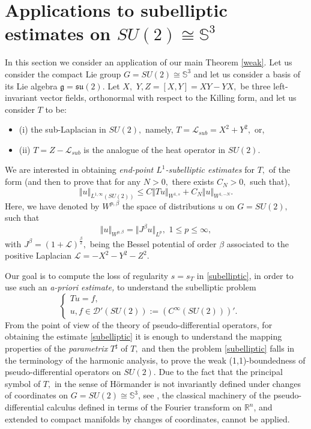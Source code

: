 \documentclass[12pt, reqno]{amsart}
\theoremstyle{definition}
\theoremstyle{remark}
\numberwithin{equation}{section}
\begin{document}
\section{Applications to subelliptic estimates on $SU(2)\cong \mathbb{S}^3$}\label{applications}
In this section we consider an application of our main Theorem \ref{weak}.
Let us consider the compact Lie group $G=SU(2)\cong \mathbb{S}^3$ and let us consider a basis of its Lie algebra $\mathfrak{g}=\mathfrak{su}(2).$ Let $X,$ $Y, Z=[X,Y]=XY-YX,$ be three left-invariant vector fields, orthonormal with respect to the Killing form, and let us consider $T$ to be: 
\begin{itemize}
    \item (i) the sub-Laplacian in $SU(2),$ namely, $T=\mathcal{L}_{sub}=X^2+Y^2,$ or,
    \item  (ii) $T=Z-\mathcal{L}_{sub}$ is the analogue of the heat operator in $SU(2).$
\end{itemize}  We are interested in obtaining {\it end-point $L^1$-subelliptic estimates} for $T,$ of the form (and then to prove that for any $N>0,$ there exists $C_N>0,$ such that),
\begin{equation}\label{subelliptic}
    \Vert u\Vert_{L^{1,\infty}(SU(2))}\leq C \Vert Tu\Vert_{W^{1,s}}+C_N\Vert u\Vert_{W^{1,-N}}.
\end{equation}
Here, we have denoted by $W^{p,\beta}$ the space of distributions $u$ on $G=SU(2),$ such that 
\begin{equation}
    \Vert u\Vert_{W^{p,\beta}}=\Vert J^\beta u\Vert_{L^p},\,\,1\leq p\leq \infty,
\end{equation} with $J^\beta=(1+\mathcal{L})^\frac{\beta}{2},$ being the Bessel potential of order $\beta$ associated to the positive Laplacian $\mathcal{L}=-X^2-Y^2-Z^2.$

Our goal is to compute the loss of regularity $s=s_T$  in \eqref{subelliptic}, in order to use such an {\it a-priori estimate,} to understand the subelliptic problem
\begin{equation}\label{IVP} \begin{cases}Tu=f ,& \text{ }
\\u,f\in \mathscr{D}'(SU(2)):=(C^\infty(SU(2)))'. & \text{ } \end{cases}
\end{equation} From the point of view of the theory of pseudo-differential operators, for obtaining the estimate \eqref{subelliptic} it is enough to understand the mapping properties of  the {\it parametrix } $T^{\sharp}$ of $T,$ and then the problem \eqref{subelliptic} falls in the terminology of the harmonic analysis, to prove the weak (1,1)-boundedness of pseudo-differential operators on  $SU(2).$ Due to the fact that the principal symbol  of $T,$ in the sense of H\"ormander \cite{Hormander1985III} is not invariantly defined under changes of coordinates on $G=SU(2)\cong \mathbb{S}^3$, see \cite{9}, the classical machinery of the pseudo-differential calculus defined in terms of the Fourier transform on $\mathbb{R}^n$, and extended to compact manifolds by changes of coordinates, cannot be applied.
\end{document}
